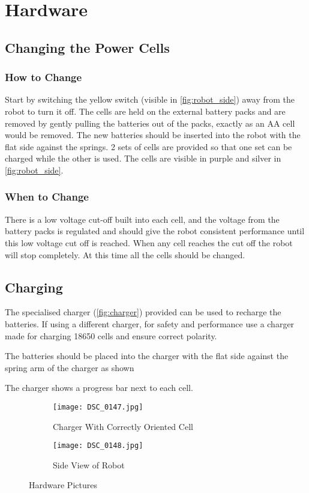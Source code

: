 
\section{Hardware}

\subsection{Changing the Power Cells}
\subsubsection{How to Change}
Start by switching the yellow switch (visible in \autoref{fig:robot_side}) away from the robot to turn it off. The cells are held on the external battery packs and are removed by gently pulling the batteries out of the packs, exactly as an AA cell would be removed.  The new batteries should be inserted into the robot with the flat side against the springs. 2 sets of cells are provided so that one set can be charged while the other is used. The cells are visible in purple and silver in \autoref{fig:robot_side}.

\subsubsection{When to Change}
There is a low voltage cut-off built into each cell, and the voltage from the battery packs is regulated and should give the robot consistent performance until this low voltage cut off is reached. When any cell reaches the cut off the robot will stop completely. At this time all the cells should be changed. 


\subsection{Charging}
The specialised charger (\autoref{fig:charger}) provided can be used to recharge the batteries. If using a different charger, for safety and performance use a charger made for charging 18650 cells and ensure correct polarity.

The batteries should be placed into the charger with the flat side against the spring arm of the charger as shown

The charger shows a progress bar next to each cell. 


\begin{figure}[H]
\centering
\begin{subfigure}{.5\textwidth}
\centering
\texttt{[image: DSC\_0147.jpg]}
\caption{Charger With Correctly Oriented Cell}
\label{fig:charger}
\end{subfigure}%
\begin{subfigure}{.5\textwidth}
\centering
\texttt{[image: DSC\_0148.jpg]}
\caption{Side View of Robot}
\label{fig:robot_side}
\end{subfigure}
\caption{Hardware Pictures}
\label{fig:pics}
\end{figure}



